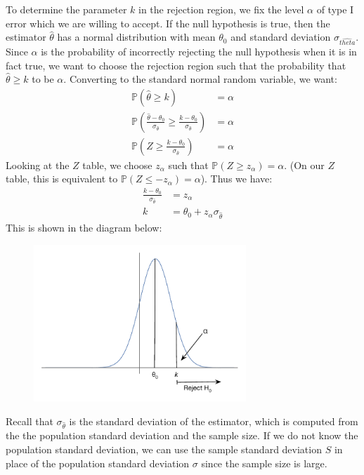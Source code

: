 \documentclass[12pt]{article}
\theoremstyle{definition}
\theoremstyle{remark}
\def\P{{\mathbb P}}
\begin{document}
To determine the parameter $k$ in the rejection region, we fix the level $\alpha$ of type I error which we are willing to accept. If the null hypothesis is true, then the estimator $\hat{\theta}$ has a normal distribution with mean $\theta_0$ and standard deviation $\sigma_{\hat{theta}}$. Since $\alpha$ is the probability of incorrectly rejecting the null hypothesis when it is in fact true, we want to choose the rejection region such that the probability that $\hat{\theta} \geq k$ to be $\alpha$. Converting to the standard normal random variable, we want:
\begin{align*}
\P(\hat{\theta} \geq k) &= \alpha \\
\P\left( \frac{ \hat{\theta} - \theta_0 }{ \sigma_{\hat{\theta}} } \geq \frac{ k - \theta_0}{\sigma_{\hat{\theta}} }\right) &= \alpha \\
\P\left( Z \geq \frac{ k - \theta_0}{\sigma_{\hat{\theta}}} \right) &= \alpha
\end{align*}
Looking at the $Z$ table, we choose $z_\alpha$ such that $\P(Z \geq z_\alpha) = \alpha$. (On our $Z$ table, this is equivalent to $\P(Z \leq -z_\alpha) = \alpha$). Thus we have:
\begin{align*}
\frac{ k - \theta_0}{\sigma_{\hat{\theta}}}  &= z_\alpha \\
k &= \theta_0 + z_\alpha \sigma_{\hat{\theta}}
\end{align*}
This is shown in the diagram below:

\begin{figure}[H]
\centering
\includegraphics[width=8cm]{uppertail}
\end{figure}


Recall that $\sigma_{\hat{\theta}}$ is the standard deviation of the estimator, which is computed from the the population standard deviation and the sample size. If we do not know the population standard deviation, we can use the sample standard deviation $S$ in place of the population standard deviation $\sigma$ since the sample size is large.
\end{document}
